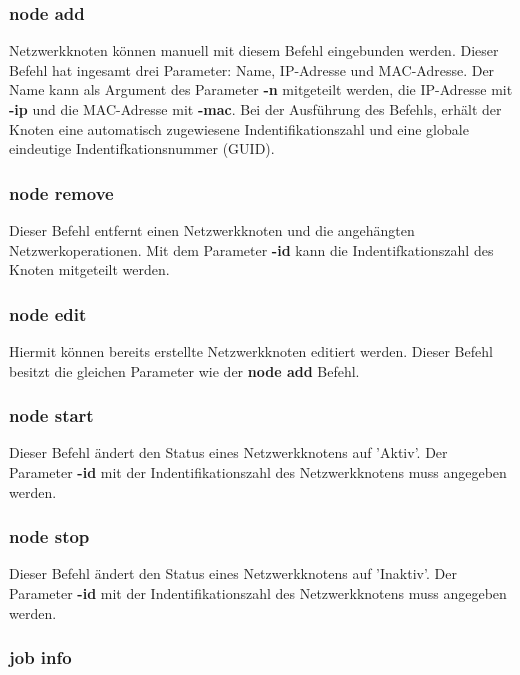 \documentclass[12pt,a4paper]{report}
\begin{document}
\begin{onehalfspace}
\subsubsection{node add}

Netzwerkknoten können manuell mit diesem Befehl eingebunden werden. Dieser Befehl hat ingesamt drei Parameter: Name, IP-Adresse und MAC-Adresse. Der Name kann als Argument des Parameter \textbf{-n} mitgeteilt werden, die IP-Adresse mit \textbf{-ip} und die MAC-Adresse mit \textbf{-mac}. Bei der Ausführung des Befehls, erhält der Knoten eine automatisch zugewiesene Indentifikationszahl und eine globale eindeutige Indentifkationsnummer (GUID).

\subsubsection{node remove}

Dieser Befehl entfernt einen Netzwerkknoten und die angehängten Netzwerkoperationen. Mit dem Parameter \textbf{-id} kann die Indentifkationszahl des Knoten mitgeteilt werden.

\subsubsection{node edit}

Hiermit können bereits erstellte Netzwerkknoten editiert werden. Dieser Befehl besitzt die gleichen Parameter wie der \textbf{node add} Befehl.

\subsubsection{node start}

Dieser Befehl ändert den Status eines Netzwerkknotens auf 'Aktiv'. Der Parameter \textbf{-id} mit der Indentifikationszahl des Netzwerkknotens muss angegeben werden.

\subsubsection{node stop}

Dieser Befehl ändert den Status eines Netzwerkknotens auf 'Inaktiv'. Der Parameter \textbf{-id} mit der Indentifikationszahl des Netzwerkknotens muss angegeben werden.

\subsubsection{job info}


\end{onehalfspace}
\end{document}
